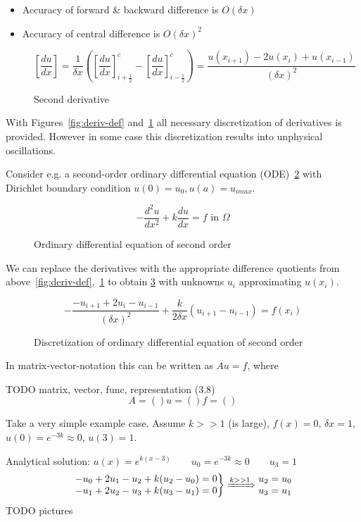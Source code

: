 \begin{itemize}
	\item Accuracy of forward \& backward difference is $O(\delta x)$
	\item Accuracy of central difference is $O(\delta x)^2$
\end{itemize}

\begin{figure}[H]
	\centering
	\[ \left[\frac{d u}{d x}\right] = \frac{1}{\delta x}\left(\left[\frac{d u}{d x}\right]^c_{i+\frac{1}{2}} - \left[\frac{d u}{d x}\right]^c_{i-\frac{1}{2}}\right) = \frac{u(x_{i+1}) - 2u(x_i) + u(x_{i-1})}{(\delta x)^2}  \]
    \renewcommand{\thefigure}{3.5}
	\caption{Second derivative}
	\label{fig:deriv-def2}
\end{figure}


With Figures~\ref{fig:deriv-def} and~\ref{fig:deriv-def2} all necessary discretization of derivatives is provided. However in some case this discretization results into unphysical oscillations.

Consider e.g. a second-order ordinary differential equation (ODE)~\ref{fig:ode} with Dirichlet boundary condition $u(0) = u_0, u(a) = u_{imax}$.
\begin{figure}[H]
	\centering
	\[ -\frac{d^2 u }{dx^2} + k \frac{du}{dx} = f \text{ in } \Omega \]
	\renewcommand{\thefigure}{3.6}
	\caption{Ordinary differential equation of second order}
	\label{fig:ode}
\end{figure}

We can replace the derivatives with the appropriate difference quotients from above~\ref{fig:deriv-def},~\ref{fig:deriv-def2} to obtain \ref{fig:disc-ode} with unknowns $u_i$ approximating $u(x_i)$.

\begin{figure}[H]
	\centering
	\[ -\frac{-u_{i+1} + 2u_i - u_{i-1}}{(\delta x)^2} + \frac{k}{2 \delta x} (u_{i+1} -u_{i-1}) = f(x_i)\]
	\renewcommand{\thefigure}{3.7}
	\caption{Discretization of ordinary differential equation of second order}
	\label{fig:disc-ode}
\end{figure}

In matrix-vector-notation this can be written as $Au = f$, where 

TODO matrix, vector, func, representation (3.8)
\[
A = ()  u = ()   f = ()
\]

Take a very simple example case. Assume $k >> 1$ (is large), $f(x) = 0$, $\delta x = 1$, $u(0) = e^{-3k} \approx 0$, $u(3) = 1$.

Analytical solution: $u(x) = e^{k(x-3)} \qquad u_0 = e^{-3k} \approx 0 \qquad u_3 = 1$
\[\left.\begin{matrix}
	-u_0 + 2u_1 -u_2  + k(u_2 -u_0) =0\\
	-u_1 + 2u_2 - u_3 + k(u_3-u_1) = 0
	\end{matrix}\right\rbrace \xRightarrow{k >> 1}\begin{matrix}
	u_2 = u_0\\
	u_3 = u_1
	\end{matrix} \]
TODO pictures

